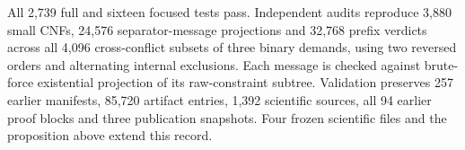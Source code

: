 All 2,739 full and sixteen focused tests pass. Independent audits reproduce
3,880 small CNFs, 24,576 separator-message projections and 32,768 prefix
verdicts across all 4,096 cross-conflict subsets of three binary demands, using
two reversed orders and alternating internal exclusions. Each message is checked
against brute-force existential projection of its raw-constraint subtree.
Validation preserves 257 earlier manifests, 85,720 artifact entries, 1,392
scientific sources, all 94 earlier proof blocks and three publication snapshots.
Four frozen scientific files and the proposition above extend this record.
